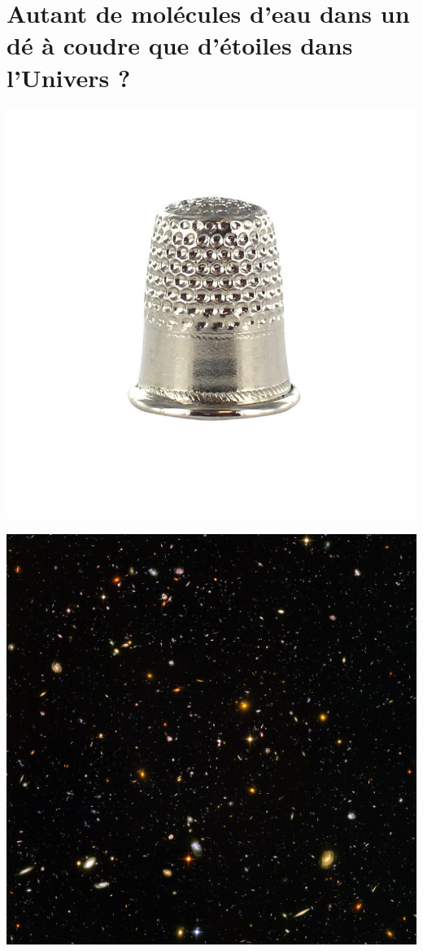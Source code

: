 \documentclass[12pt,a4paper,fleqn]{article}
\begin{document}
\section*{Autant de molécules d'eau dans un dé à coudre que d'étoiles dans l'Univers ?}

\begin{multicols}{2}
\begin{center}
\includegraphics[angle=180,width=\linewidth]{images/de_a_coudre.jpg}

\includegraphics[width=\linewidth]{images/hubble_ultra_deep_field.jpg}
\end{center}
\end{multicols}
\end{document}
